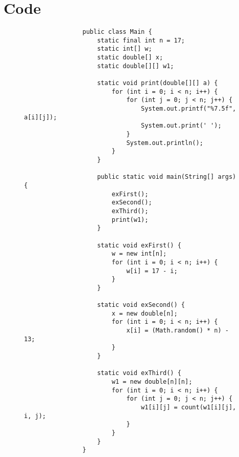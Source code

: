 \documentclass[12pt]{article}
\begin{document}
	\section{\LARGE Code}
	\begin{figure}[H]
		\setlength{\fboxsep}{0pt}
		\setlength{\fboxrule}{0pt}
		\begin{center}
			\begin{lstlisting}
				public class Main {
					static final int n = 17;
					static int[] w;
					static double[] x;
					static double[][] w1; 
					
					static void print(double[][] a) {
						for (int i = 0; i < n; i++) {
							for (int j = 0; j < n; j++) {
								System.out.printf("%7.5f", a[i][j]);
								System.out.print(' ');
							}
							System.out.println();
						}
					}
					
					public static void main(String[] args) {   
						exFirst();
						exSecond();
						exThird();
						print(w1);
					}
					
					static void exFirst() {
						w = new int[n];
						for (int i = 0; i < n; i++) {
							w[i] = 17 - i;
						}
					} 
					
					static void exSecond() {
						x = new double[n];
						for (int i = 0; i < n; i++) {
							x[i] = (Math.random() * n) - 13;
						}
					}
					
					static void exThird() {
						w1 = new double[n][n];
						for (int i = 0; i < n; i++) {
							for (int j = 0; j < n; j++) {
								w1[i][j] = count(w1[i][j], i, j);
							}
						}
					}
				}
			\end{lstlisting}
		\end{center}
	\end{figure}
\end{document}
